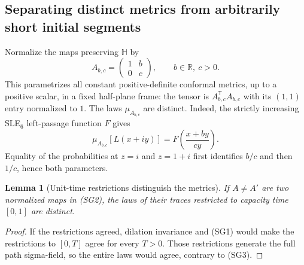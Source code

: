 \documentclass[11pt]{article}
\newtheorem{lemma}[theorem]{Lemma}
\theoremstyle{definition}\newtheorem{definition}[theorem]{Definition}
\theoremstyle{remark}\newtheorem{remark}[theorem]{Remark}
\begin{document}
\subsection{Separating distinct metrics from arbitrarily short initial segments}

Normalize the maps preserving $\mathbb H$ by
\[
 A_{b,c}=\begin{pmatrix}1&b\\0&c\end{pmatrix},
 \qquad b\in\mathbb R,\ c>0.
 \tag{SG2}
\]
This parametrizes all constant positive-definite conformal metrics, up to a
positive scalar, in a fixed half-plane frame: the tensor is
$A_{b,c}^{\mathsf T}A_{b,c}$ with its $(1,1)$ entry normalized to $1$.
The laws $\mu_{A_{b,c}}$ are distinct. Indeed, the strictly increasing SLE$_6$
left-passage function $F$ gives
\[
 \mu_{A_{b,c}}[L(x+iy)]=F\left(\frac{x+by}{cy}\right).
 \tag{SG3}
\]
Equality of the probabilities at $z=i$ and $z=1+i$ first identifies $b/c$
and then $1/c$, hence both parameters.

\begin{lemma}[Unit-time restrictions distinguish the metrics]
\label{lem:sg-unitrestriction}
If $A\ne A'$ are two normalized maps in (SG2), the laws of their traces
restricted to capacity time $[0,1]$ are distinct.
\end{lemma}
\begin{proof}
If the restrictions agreed, dilation invariance and (SG1) would make the
restrictions to $[0,T]$ agree for every $T>0$. Those restrictions generate the
full path sigma-field, so the entire laws would agree, contrary to (SG3).
\end{proof}
\end{document}
